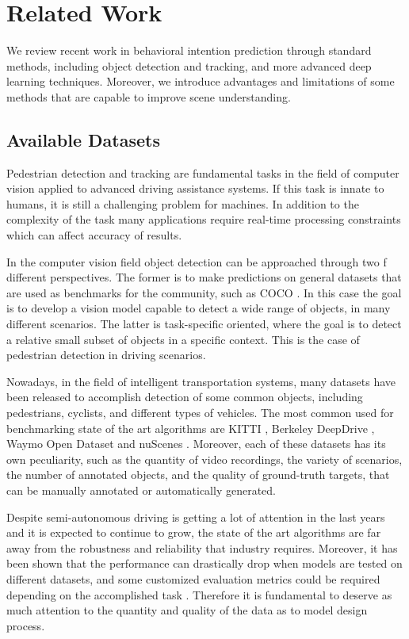\chapter{Related Work}
\label{chpt:related_work}
We review recent work in behavioral intention prediction through standard 
methods, including object detection and tracking, and more advanced deep learning 
techniques. Moreover, we introduce advantages and limitations of some methods 
that are capable to improve scene understanding.

\section{Available Datasets}
Pedestrian detection and tracking are fundamental tasks in the field of computer 
vision applied to advanced driving assistance systems. If this task is innate 
to humans, it is still a challenging problem for machines. In addition to the 
complexity of the task many applications require real-time processing 
constraints which can affect accuracy of results. 

In the computer vision field object detection can be approached through two f
different perspectives. The former is to make predictions on general datasets 
that are used as benchmarks for the community, such as COCO \cite{coco}.
In this case the goal is to develop a vision model capable to detect a wide 
range of objects, in many different scenarios.
The latter is task-specific oriented, where the goal is to detect a relative 
small subset of objects in a specific context. This is the case of pedestrian 
detection in driving scenarios.

Nowadays, in the field of intelligent transportation systems, many datasets 
have been released to accomplish detection of some common objects, including 
pedestrians, cyclists, and different types of vehicles.
The most common used for benchmarking state of the art algorithms are KITTI 
\cite{kitti}, Berkeley DeepDrive \cite{bdd100k}, Waymo Open Dataset 
\cite{waymo} and nuScenes \cite{nuscenes}. Moreover, each of these datasets 
has its own peculiarity, such as the quantity of video recordings, the variety 
of scenarios, the number of annotated objects, and the quality of ground-truth 
targets, that can be manually annotated or automatically generated.

Despite semi-autonomous driving is getting a lot of attention in the last years 
and it is expected to continue to grow, the state of the art algorithms are far 
away from the robustness and reliability that industry requires. Moreover, it 
has been shown that the performance can drastically drop when models are tested 
on different datasets, and some customized evaluation metrics could be required 
depending on the accomplished task \cite{uricar2019challenges}.
Therefore it is fundamental to deserve as much attention to the quantity and quality of the data 
as to model design process.

